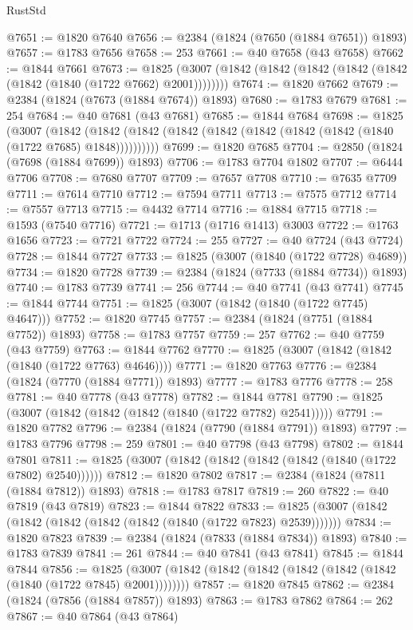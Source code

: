 \begin{lexlean}{RustStd}
\begin{coremodule}
@7651 := @1820 @7640
@7656 := @2384 (@1824 (@7650 (@1884 @7651)) @1893)
@7657 := @1783 @7656
@7658 := 253
@7661 := @40 @7658 (@43 @7658)
@7662 := @1844 @7661
@7673 := @1825 (@3007 (@1842 (@1842 (@1842 (@1842 (@1842 (@1842 (@1840 (@1722 @7662) @2001))))))))
@7674 := @1820 @7662
@7679 := @2384 (@1824 (@7673 (@1884 @7674)) @1893)
@7680 := @1783 @7679
@7681 := 254
@7684 := @40 @7681 (@43 @7681)
@7685 := @1844 @7684
@7698 := @1825
    (@3007
      (@1842 (@1842 (@1842 (@1842 (@1842 (@1842 (@1842 (@1842 (@1840 (@1722 @7685) @1848))))))))))
@7699 := @1820 @7685
@7704 := @2850 (@1824 (@7698 (@1884 @7699)) @1893)
@7706 := @1783 @7704 @1802
@7707 := @6444 @7706
@7708 := @7680 @7707
@7709 := @7657 @7708
@7710 := @7635 @7709
@7711 := @7614 @7710
@7712 := @7594 @7711
@7713 := @7575 @7712
@7714 := @7557 @7713
@7715 := @4432 @7714
@7716 := @1884 @7715
@7718 := @1593 (@7540 @7716)
@7721 := @1713 (@1716 @1413) @3003
@7722 := @1763 @1656
@7723 := @7721 @7722
@7724 := 255
@7727 := @40 @7724 (@43 @7724)
@7728 := @1844 @7727
@7733 := @1825 (@3007 (@1840 (@1722 @7728) @4689))
@7734 := @1820 @7728
@7739 := @2384 (@1824 (@7733 (@1884 @7734)) @1893)
@7740 := @1783 @7739
@7741 := 256
@7744 := @40 @7741 (@43 @7741)
@7745 := @1844 @7744
@7751 := @1825 (@3007 (@1842 (@1840 (@1722 @7745) @4647)))
@7752 := @1820 @7745
@7757 := @2384 (@1824 (@7751 (@1884 @7752)) @1893)
@7758 := @1783 @7757
@7759 := 257
@7762 := @40 @7759 (@43 @7759)
@7763 := @1844 @7762
@7770 := @1825 (@3007 (@1842 (@1842 (@1840 (@1722 @7763) @4646))))
@7771 := @1820 @7763
@7776 := @2384 (@1824 (@7770 (@1884 @7771)) @1893)
@7777 := @1783 @7776
@7778 := 258
@7781 := @40 @7778 (@43 @7778)
@7782 := @1844 @7781
@7790 := @1825 (@3007 (@1842 (@1842 (@1842 (@1840 (@1722 @7782) @2541)))))
@7791 := @1820 @7782
@7796 := @2384 (@1824 (@7790 (@1884 @7791)) @1893)
@7797 := @1783 @7796
@7798 := 259
@7801 := @40 @7798 (@43 @7798)
@7802 := @1844 @7801
@7811 := @1825 (@3007 (@1842 (@1842 (@1842 (@1842 (@1840 (@1722 @7802) @2540))))))
@7812 := @1820 @7802
@7817 := @2384 (@1824 (@7811 (@1884 @7812)) @1893)
@7818 := @1783 @7817
@7819 := 260
@7822 := @40 @7819 (@43 @7819)
@7823 := @1844 @7822
@7833 := @1825 (@3007 (@1842 (@1842 (@1842 (@1842 (@1842 (@1840 (@1722 @7823) @2539)))))))
@7834 := @1820 @7823
@7839 := @2384 (@1824 (@7833 (@1884 @7834)) @1893)
@7840 := @1783 @7839
@7841 := 261
@7844 := @40 @7841 (@43 @7841)
@7845 := @1844 @7844
@7856 := @1825 (@3007 (@1842 (@1842 (@1842 (@1842 (@1842 (@1842 (@1840 (@1722 @7845) @2001))))))))
@7857 := @1820 @7845
@7862 := @2384 (@1824 (@7856 (@1884 @7857)) @1893)
@7863 := @1783 @7862
@7864 := 262
@7867 := @40 @7864 (@43 @7864)

\end{coremodule}
\end{lexlean}
